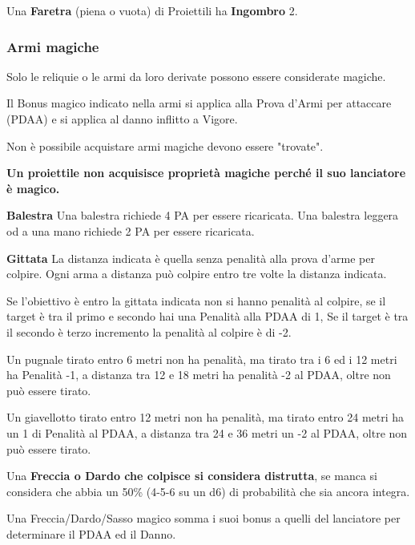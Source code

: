 \documentclass[12pt,a4paper,twoside,openany]{book}
\begin{document}
\medskip

Una \textbf{Faretra} (piena o vuota) di Proiettili ha \textbf{Ingombro} 2.\\

\begin{multicols}{2}
	
\subsubsection{Armi magiche}	

Solo le reliquie o le armi da loro derivate possono essere considerate magiche.

Il Bonus magico indicato nella armi si applica alla Prova d'Armi per attaccare (PDAA) e si applica al danno inflitto a Vigore.

Non è possibile acquistare armi magiche devono essere "trovate".

\textbf{Un proiettile non acquisisce proprietà magiche perché il suo lanciatore è magico.}

\bigskip



\textbf{Balestra}
Una balestra richiede 4 PA per essere ricaricata. Una balestra leggera od a una mano richiede 2 PA per essere ricaricata.

\textbf{Gittata}
La distanza indicata è quella senza penalità alla prova d'arme per colpire. Ogni arma a distanza può colpire entro tre volte la distanza indicata.

Se l'obiettivo è entro la gittata indicata non si hanno penalità al colpire, se il target è tra il primo e secondo hai una Penalità alla PDAA di 1, Se il target è tra il secondo è terzo incremento la penalità al colpire è di -2.

Un pugnale tirato entro 6 metri non ha penalità, ma tirato tra i 6 ed i 12 metri ha Penalità -1, a distanza tra 12 e 18 metri ha penalità -2 al PDAA, oltre non può essere tirato.

Un giavellotto tirato entro 12 metri non ha penalità, ma tirato entro 24 metri ha un 1 di Penalità al PDAA, a distanza tra 24 e 36 metri un -2 al PDAA, oltre non può essere tirato.

Una \textbf{Freccia o Dardo che colpisce si considera distrutta}, se manca si considera che abbia un 50\% (4-5-6 su un d6) di probabilità che sia ancora integra.

Una Freccia/Dardo/Sasso magico somma i suoi bonus a quelli del lanciatore per determinare il PDAA ed il Danno.


\end{multicols}
\end{document}
